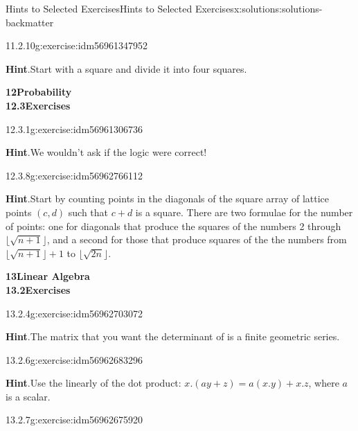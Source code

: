 \documentclass[twoside,10pt,]{book}
\newcommand{\blocktitlefont}{\relax}
\numberwithin{equation}{section}
\begin{document}
\begin{solutions-chapter}{Hints  to Selected Exercises}{}{Hints  to Selected Exercises}{}{}{x:solutions:solutions-backmatter}
\begin{divisionsolution}{11.2.10}{}{g:exercise:idm56961347952}
\par\smallskip%
\noindent\textbf{\blocktitlefont Hint}.\hypertarget{g:hint:idm56961347152-back}{}\quad{}Start with a square and divide it into four squares.%
\end{divisionsolution}%
\par\medskip
\noindent\textbf{\Large{}12\space\textperiodcentered\space{}Probability\\
12.3\space\textperiodcentered\space{}Exercises}
\begin{divisionsolution}{12.3.1}{}{g:exercise:idm56961306736}%
\par\smallskip%
\noindent\textbf{\blocktitlefont Hint}.\hypertarget{g:hint:idm56961305312-back}{}\quad{}We wouldn't ask if the logic were correct!%
\end{divisionsolution}%
\begin{divisionsolution}{12.3.8}{}{g:exercise:idm56962766112}%
\par\smallskip%
\noindent\textbf{\blocktitlefont Hint}.\hypertarget{g:hint:idm56962756688-back}{}\quad{}Start by counting points in the diagonals of the square array of lattice points \((c,d)\) such that \(c+d\) is a square.  There are two formulae for the number of points: one for diagonals that produce the squares of the numbers 2 through \(\lfloor \sqrt{n+1} \rfloor\), and a second for those that produce squares of the the numbers from \(\lfloor \sqrt{n+1} \rfloor +1\) to \(\lfloor \sqrt{2n} \rfloor\).%
\end{divisionsolution}%
\par\medskip
\noindent\textbf{\Large{}13\space\textperiodcentered\space{}Linear Algebra\\
13.2\space\textperiodcentered\space{}Exercises}
\begin{divisionsolution}{13.2.4}{}{g:exercise:idm56962703072}%
\par\smallskip%
\noindent\textbf{\blocktitlefont Hint}.\hypertarget{g:hint:idm56962692592-back}{}\quad{}The matrix that you want the determinant of is a finite geometric series.%
\end{divisionsolution}%
\begin{divisionsolution}{13.2.6}{}{g:exercise:idm56962683296}%
\par\smallskip%
\noindent\textbf{\blocktitlefont Hint}.\hypertarget{g:hint:idm56962681024-back}{}\quad{}Use the linearly of the dot product: \(x.(a y+z) = a(x.y)+x.z\), where \(a\) is a scalar.%
\end{divisionsolution}%
\begin{divisionsolution}{13.2.7}{}{g:exercise:idm56962675920}%

\end{divisionsolution}
\end{solutions-chapter}
\end{document}
